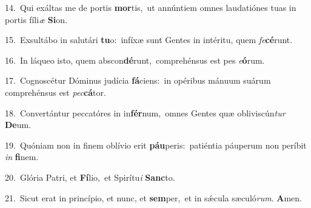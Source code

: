 {\numbfont\textcolor{\numbcolor}{14.}}~Qui exáltas me de portis \textbf{mor}\-tis,~\star ut annúntiem omnes laudatiónes tuas in portis fíli\textit{æ} \textbf{Si}\-on.\par
{\numbfont\textcolor{\numbcolor}{15.}}~Exsultábo in salutári \textbf{tu}\-o:~\star infíxæ sunt Gentes in intéritu, quem \textit{fe}\-\textbf{cé}runt.\par
{\numbfont\textcolor{\numbcolor}{16.}}~In láqueo isto, quem abscon\-\textbf{dé}\-runt,~\star comprehénsus est pes \textit{e}\-\textbf{ó}rum.\par
{\numbfont\textcolor{\numbcolor}{17.}}~Cognoscétur Dóminus judícia \textbf{fá}\-ciens:~\star in opéribus mánuum suárum comprehénsus est \textit{pec}\-\textbf{cá}tor.\par
{\numbfont\textcolor{\numbcolor}{18.}}~Convertántur peccatóres in in\-\textbf{fér}\-num,~\star omnes Gentes quæ obliviscún\textit{tur} \textbf{De}\-um.\par
{\numbfont\textcolor{\numbcolor}{19.}}~Quóniam non in finem oblívio erit \textbf{páu}\-peris:~\star patiéntia páuperum non períbit \textit{in} \textbf{fi}\-nem.\par
{\numbfont\textcolor{\numbcolor}{20.}}~Glória Patri, et \textbf{Fí}\-lio,~\star et Spirítu\textit{i} \textbf{Sanc}\-to.\par
{\numbfont\textcolor{\numbcolor}{21.}}~Sicut erat in princípio, et nunc, et \textbf{sem}\-per,~\star et in sǽcula sæculó\-\textit{rum}\-. \textbf{A}\-men.\par
